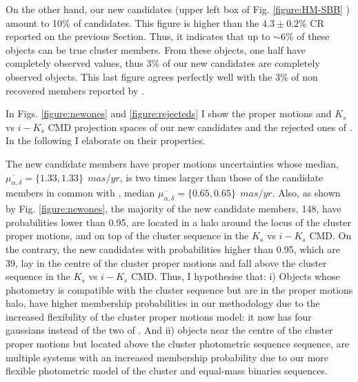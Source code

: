 On the other hand, our new candidates (upper left box of Fig. \ref{figure:HM-SBB} ) amount to 10\% of \citet{Bouy2015} candidates. This figure is higher than the $4.3\pm0.2$\% CR reported on the previous Section. Thus, it indicates that up to $\sim6\%$ of these objects can be true cluster members. From these objects, one half have completely observed values, thus 3\% of our new candidates are completely observed objects. This last figure agrees perfectly well with the 3\% of non recovered members reported by \citet{Sarro2014}. 

In Figs. \ref{figure:newones} and \ref{figure:rejecteds} I show the proper motions and $K_s$ vs $i-K_s$ CMD projection spaces of our new candidates and the rejected ones  of \citet{Bouy2015}. In the following I elaborate on their properties.

The new candidate members have proper motions uncertainties whose median, $\overline{\mu_{\alpha,\delta}}=\{1.33,1.33\} \ \ mas/yr$, is two times larger than those of the candidate members in common with \citet{Bouy2015}, median $\overline{\mu_{\alpha,\delta}}=\{0.65,0.65\} \ \ mas/yr$. Also, as shown by Fig. \ref{figure:newones}, the majority of the new candidate members, 148, have probabilities lower than 0.95, are located in a halo around the locus of the cluster proper motions, and on top of the cluster sequence in the $K_s$ vs $i-K_s$ CMD. On the contrary, the new candidates with probabilities higher than 0.95, which are 39, lay in the centre of the cluster proper motions and fall above the cluster sequence in the $K_s$ vs $i-K_s$ CMD. Thus, I hypothesise that: i) Objects whose photometry is compatible with the cluster sequence but are in the proper motions halo, have higher membership probabilities in our methodology due to the increased flexibility of the cluster proper motions model: it now has four gaussians instead of the two of \citet{Bouy2015}. And ii) objects near the centre of the cluster proper motions but located above the cluster photometric sequence sequence, are multiple systems \cite[probably triple systems which can amount to 4\% of the population][]{Duquennoy1991} with an increased membership probability due to our more flexible photometric model of the cluster and equal-mass binaries sequences.

